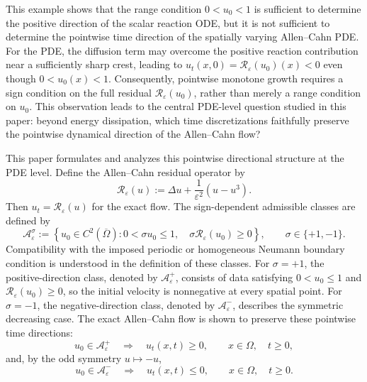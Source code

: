 \documentclass[final, 3p, times]{elsarticle}%
\newcommand{\eps}{\varepsilon}
\newcommand{\Reps}{\mathcal R_\varepsilon}
\newcommand{\Aepsp}{\mathcal A_\varepsilon^+}
\newcommand{\Aeps}{\Aepsp}
\newcommand{\Aepsm}{\mathcal A_\varepsilon^-}
\begin{document}
This example shows that the range condition \(0<u_0<1\) is sufficient
to determine the positive direction of the scalar reaction ODE, but it
is not sufficient to determine the pointwise time direction of the
spatially varying Allen--Cahn PDE. For the PDE, the diffusion term may
overcome the positive reaction contribution near a sufficiently sharp
crest, leading to
\(
u_t(x,0)=\mathcal R_\varepsilon(u_0)(x)<0
\)
even though \(0<u_0(x)<1\). Consequently, pointwise monotone growth
requires a sign condition on the full residual \(\mathcal R_\varepsilon(u_0)\),
rather than merely a range condition on \(u_0\). This observation leads
to the central PDE-level question studied in this paper: beyond energy dissipation, which time
discretizations faithfully preserve the pointwise dynamical direction of the Allen--Cahn flow?

This paper formulates and analyzes this pointwise directional structure at the PDE level. Define the Allen--Cahn residual operator by
\begin{equation}
    \Reps(u):=\Delta u+\frac1{\eps^2}(u-u^3).
    \label{eq:intro-residual-operator}
\end{equation}
Then $u_t=\Reps(u)$ for the exact flow. The sign-dependent admissible classes are defined by
\begin{equation}
    \mathcal A_\varepsilon^\sigma:=
    \left\{
    u_0\in C^2(\overline\Omega):
    0< \sigma u_0\le 1,\quad
    \sigma\Reps(u_0)\ge0
    \right\},
    \qquad \sigma\in\{+1,-1\}.
    \label{eq:Aeps-sigma}
\end{equation}
Compatibility with the imposed periodic or homogeneous Neumann boundary
condition is understood in the definition of these classes.
For $\sigma=+1$, the positive-direction class, denoted by $\Aeps$, consists of data satisfying $0< u_0\le1$ and $\Reps(u_0)\ge0$, so the initial velocity is nonnegative at every spatial point. For $\sigma=-1$, the negative-direction class, denoted by $\Aepsm$, describes the symmetric decreasing case. The exact Allen--Cahn flow is shown to preserve these pointwise time directions:
\begin{equation}
    u_0\in\Aeps \quad\Longrightarrow\quad u_t(x,t)\ge0,
    \qquad x\in\Omega,\quad t\ge0,
    \label{eq:intro-monotone-growth}
\end{equation}
and, by the odd symmetry $u\mapsto -u$,
\begin{equation}
    u_0\in\Aepsm \quad\Longrightarrow\quad u_t(x,t)\le0,
    \qquad x\in\Omega,\quad t\ge0.
    \label{eq:intro-monotone-decay}
\end{equation}
\end{document}
